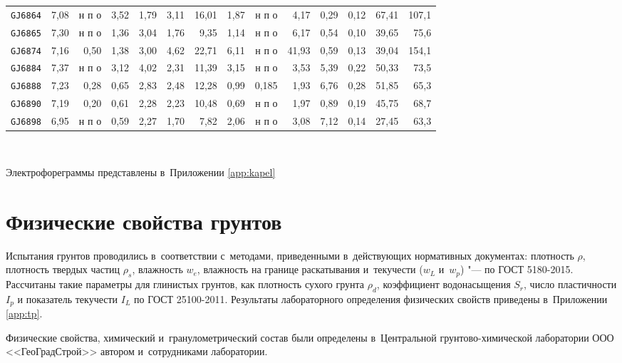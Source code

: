 \begin{table}[]
\begin{tabular}{@{}lrrrrrrrrrrrrr@{}}
    \texttt{GJ6864} & 7,08 & н п о & 3,52 & 1,79 & 3,11 & 16,01 & 1,87 & н п о &  4,17 & 0,29 & 0,12 & 67,41 & 107,1 \\
    \texttt{GJ6865} & 7,30 & н п о & 1,36 & 3,04 & 1,76 &  9,35 & 1,14 & н п о &  6,17 & 0,54 & 0,10 & 39,65 &  75,6 \\
    \texttt{GJ6874} & 7,16 & 0,50  & 1,38 & 3,00 & 4,62 & 22,71 & 6,11 & н п о & 41,93 & 0,59 & 0,13 & 39,04 & 154,1 \\
    \texttt{GJ6884} & 7,37 & н п о & 3,12 & 4,02 & 2,31 & 11,39 & 3,15 & н п о &  3,53 & 5,39 & 0,22 & 50,33 &  73,5 \\
    \texttt{GJ6888} & 7,23 & 0,28  & 0,65 & 2,83 & 2,48 & 12,28 & 0,99 & 0,185 &  1,93 & 6,76 & 0,28 & 51,85 &  65,3 \\
    \texttt{GJ6890} & 7,19 & 0,20  & 0,61 & 2,28 & 2,23 & 10,48 & 0,69 & н п о &  1,97 & 0,89 & 0,19 & 45,75 &  68,7 \\
    \texttt{GJ6898} & 6,95 & н п о & 0,59 & 2,27 & 1,70 &  7,82 & 2,06 & н п о &  3,08 & 7,12 & 0,14 & 27,45 &  63,3 \\
    \bottomrule 
    \end{tabular}
    \\ 
\end{table}

Электрофореграммы представлены в~Приложении \ref{app:kapel}


\section{Физические свойства грунтов}

Испытания грунтов проводились в~соответствии с~методами, приведенными в~действующих нормативных документах:
плотность $\rho$, 
плотность твердых частиц $\rho_s$, 
влажность $w_e$, 
влажность на границе раскатывания и~текучести ($w_L$ и~$w_p$) "--- по ГОСТ 5180-2015. 
Рассчитаны такие параметры для глинистых грунтов, как
плотность сухого грунта $\rho_d$,  
коэффициент водонасыщения $S_r$, 
число пластичности $I_p$ 
и показатель текучести $I_L$ по ГОСТ 25100-2011.
Результаты лабораторного определения физических свойств приведены в~Приложении \ref{app:tp}.



Физические свойства, химический и~гранулометрический состав были определены в~Центральной грунтово-химической лаборатории ООО <<ГеоГрадСтрой>> автором и~сотрудниками лаборатории. 


